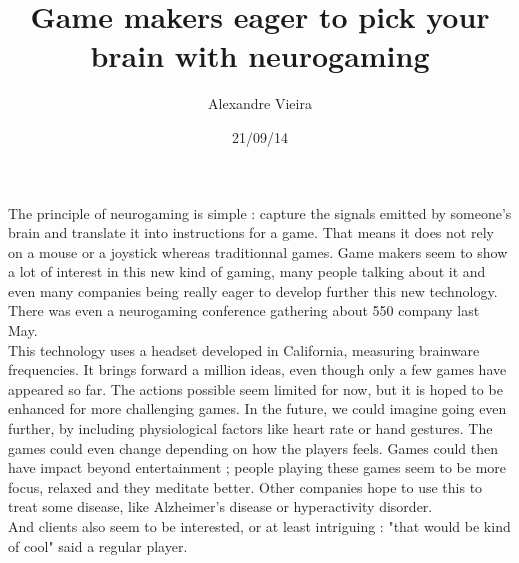\documentclass{article}
\title{Game makers eager to pick your brain with neurogaming}
\author{Alexandre Vieira}
\date{21/09/14}
\begin{document}
\maketitle
The principle of neurogaming is simple : capture the signals emitted by someone's brain and translate it into instructions for a game. That means it does not rely on a mouse or a joystick whereas traditionnal games. Game makers seem to show a lot of interest in this new kind of gaming, many people talking about it and even many companies being really eager to develop further this new technology. There was even a neurogaming conference gathering about 550 company last May.\\
This technology uses a headset developed in California, measuring brainware frequencies. It brings forward a million ideas, even though only a few games have appeared so far. The actions possible seem limited for now, but it is hoped to be enhanced for more challenging games. In the future, we could imagine going even further, by including physiological factors like heart rate or hand gestures. The games could even change depending on how the players feels. Games could then have impact beyond entertainment ; people playing these games seem to be more focus, relaxed and they meditate better. Other companies hope to use this to treat some disease, like Alzheimer's disease or hyperactivity disorder.\\
And clients also seem to be interested, or at least intriguing : "that would be kind of cool" said a regular player.
\end{document}

